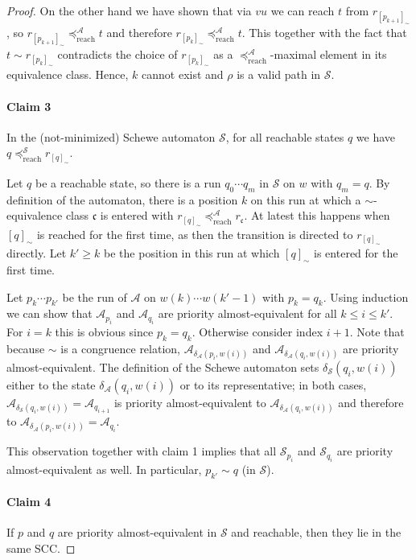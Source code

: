 \begin{proof}
	On the other hand we have shown that via $vu$ we can reach $t$ from $r_{[p_{k+1}]_\sim}$, so $r_{[p_{k+1}]_\sim} \preceq_\text{reach}^\mathcal{A} t$ and therefore $r_{[p_k]_\sim} \preceq_\text{reach}^\mathcal{A} t$. This together with the fact that $t \sim r_{[p_k]_\sim}$ contradicts the choice of $r_{[p_k]_\sim}$ as a $\preceq_\text{reach}^\mathcal{A}$-maximal element in its equivalence class. Hence, $k$ cannot exist and $\rho$ is a valid path in $\mathcal{S}$.
	
	\paragraph{Claim 3} In the (not-minimized) Schewe automaton $\mathcal{S}$, for all reachable states $q$ we have $q \preceq_\text{reach}^\mathcal{S} r_{[q]_\sim}$.
	
	Let $q$ be a reachable state, so there is a run $q_0 \cdots q_m$ in $\mathcal{S}$ on $w$ with $q_m = q$. By definition of the automaton, there is a position $k$ on this run at which a $\sim$-equivalence class $\mathfrak{c}$ is entered with $r_{[q]_\sim} \preceq_\text{reach}^\mathcal{A} r_\mathfrak{c}$. At latest this happens when $[q]_\sim$ is reached for the first time, as then the transition is directed to $r_{[q]_\sim}$ directly. Let $k' \geq k$ be the position in this run at which $[q]_\sim$ is entered for the first time.
	
	Let $p_k \cdots p_{k'}$ be the run of $\mathcal{A}$ on $w(k) \cdots w(k'-1)$ with $p_k = q_k$. Using induction we can show that $\mathcal{A}_{p_i}$ and $\mathcal{A}_{q_i}$ are priority almost-equivalent for all $k \leq i \leq k'$. For $i = k$ this is obvious since $p_k = q_k$. Otherwise consider index $i+1$. Note that because $\sim$ is a congruence relation, $\mathcal{A}_{\delta_\mathcal{A}(p_i, w(i))}$ and $\mathcal{A}_{\delta_\mathcal{A}(q_i, w(i))}$ are priority almost-equivalent. The definition of the Schewe automaton sets $\delta_\mathcal{S}(q_i, w(i))$ either to the state $\delta_\mathcal{A}(q_i, w(i))$ or to its representative; in both cases, $\mathcal{A}_{\delta_\mathcal{S}(q_i, w(i))} = \mathcal{A}_{q_{i+1}}$ is priority almost-equivalent to $\mathcal{A}_{\delta_\mathcal{A}(q_i, w(i))}$ and therefore to $\mathcal{A}_{\delta_\mathcal{A}(p_i, w(i))} = \mathcal{A}_{q_i}$.
	
	This observation together with claim 1 implies that all $\mathcal{S}_{p_i}$ and $\mathcal{S}_{q_i}$ are priority almost-equivalent as well. In particular, $p_{k'} \sim q$ (in $\mathcal{S}$). 
	

	\paragraph{Claim 4} If $p$ and $q$ are priority almost-equivalent in $\mathcal{S}$ and reachable, then they lie in the same SCC.

\end{proof}

